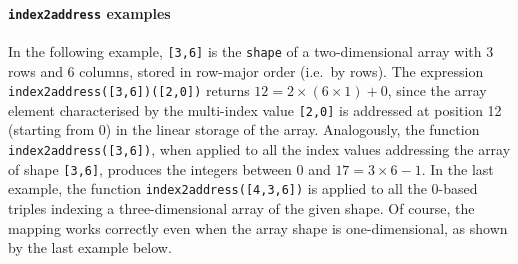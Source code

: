\documentclass[11pt,oneside]{article}	%
\begin{document}
\paragraph{\texttt{index2address} examples}
In the following example, \texttt{[3,6]} is the \texttt{shape} of a two-dimen\-sion\-al array with 3 rows and 6 columns, stored in row-major order (i.e.~by rows). The expression \texttt{index2address([3,6])([2,0])} returns $12=2\times(6\times 1)+0$, since the array element characterised by the multi-index value \texttt{[2,0]} is addressed at position 12 (starting from 0) in the linear storage of the array. Analogously, the function \texttt{index2address([3,6])}, when applied to all the index values addressing the array of shape \texttt{[3,6]}, produces the integers between 0 and $17 = 3\times 6 -1$. In the last example, the function \texttt{index2address([4,3,6])} is applied to all the 0-based triples indexing a three-dimensional array of the given shape. Of course, the mapping works correctly even when the array shape is one-dimensional, as shown by the last example below.
\end{document}
